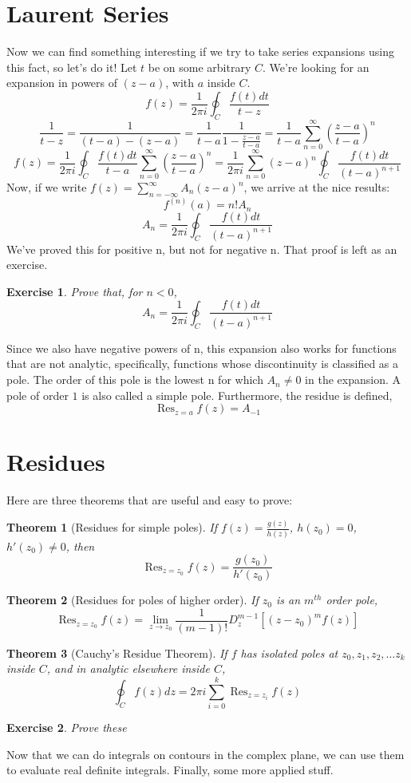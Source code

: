 \documentclass[11pt,notitlepage]{article}
\DeclareMathOperator*{\res}{Res}
\newtheorem{thm}{Theorem}[section]
\newtheorem{exc}{Exercise}[section]
\begin{document}
\section{Laurent Series}
Now we can find something interesting if we try to take series expansions using this fact, so let's do it! Let $t$ be on some arbitrary $C$. We're looking for an expansion in powers of $(z-a)$, with $a$ inside $C$. 
$$ f(z) = \frac1{2\pi i}\oint_{C} \frac{f(t) dt}{t-z} $$
$$\frac1{t-z} = \frac1{(t-a)-(z-a)} = \frac1{t-a}\frac1{1-{\frac{z-a}{t-a}}} = \frac1{t-a}\sum_{n=0}^\infty\left(\frac{z-a}{t-a}\right)^n $$
$$ f(z) = \frac1{2\pi i}\oint_{C} \frac{f(t) dt}{t-a} \sum_{n=0}^\infty\left(\frac{z-a}{t-a}\right)^n  = \frac1{2\pi i} \sum_{n=0}^\infty{(z-a)}^n \oint_{C} \frac{f(t) dt}{(t-a)^{n+1}} $$
Now, if we write $f(z) = \sum_{n=-\infty}^\infty A_n (z-a)^n$, we arrive at the nice results:
 $$f^{(n)}(a) = n! A_n$$
 $$A_n = \frac1{2\pi i} \oint_{C}\frac{f(t) dt}{(t-a)^{n+1}}$$
We've proved this for positive n, but not for negative n. That proof is left as an exercise.
\begin{exc}
Prove that, for $n<0$,
 $$A_n = \frac1{2\pi i} \oint_{C}\frac{f(t) dt}{(t-a)^{n+1}}$$
\end{exc}
Since we also have negative powers of n, this expansion also works for functions that are not analytic, specifically, functions whose discontinuity is classified as a pole. The order of this pole is the lowest n for which $A_n \not=0$ in the expansion. A pole of order $1$ is also called a simple pole. Furthermore, the residue is defined, $$\res_{z=a} f(z) = A_{-1}$$
\section{Residues}
Here are three theorems that are useful and easy to prove:
\begin{thm}[Residues for simple poles]
If $f(z)=\frac{g(z)}{h(z)}$, $h(z_0)=0$, $h'(z_0)\not=0$, then $$\res_{z=z_0} f(z) = \frac{g(z_0)}{h'(z_0)}$$
\end{thm}
\begin{thm}[Residues for poles of higher order]
If $z_0$ is an $m^{th}$ order pole, 
$$\res_{z=z_0} f(z) = \lim_{z\rightarrow z_0} \frac1{(m-1)!} D_z^{m-1} \left[(z-z_0)^m f(z)\right]$$
\end{thm}
\begin{thm}[Cauchy's Residue Theorem]
If $f$ has isolated poles at $z_0,z_1,z_2, \ldots z_k$ inside $C$, and in analytic elsewhere inside $C$,
$$\oint_C f(z) dz = 2\pi i\sum_{i=0}^k \res_{z=z_i} f(z)$$
\end{thm}
\begin{exc} Prove these
\end{exc}
Now that we can do integrals on contours in the complex plane, we can use them to evaluate real definite integrals. Finally, some more applied stuff.
\end{document}
